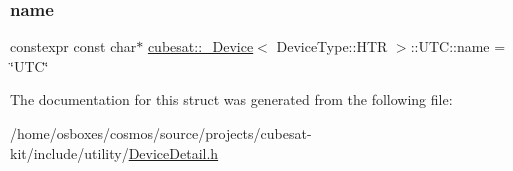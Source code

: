 \subsubsection{\texorpdfstring{name}{name}}
{\footnotesize\ttfamily constexpr const char$\ast$ \hyperlink{structcubesat_1_1__Device}{cubesat\+::\+\_\+\+Device}$<$ Device\+Type\+::\+H\+TR $>$\+::U\+T\+C\+::name = \char`\"{}U\+TC\char`\"{}\hspace{0.3cm}{\ttfamily [static]}}



The documentation for this struct was generated from the following file\+:\begin{DoxyCompactItemize}
\item 
/home/osboxes/cosmos/source/projects/cubesat-\/kit/include/utility/\hyperlink{DeviceDetail_8h}{Device\+Detail.\+h}\end{DoxyCompactItemize}
